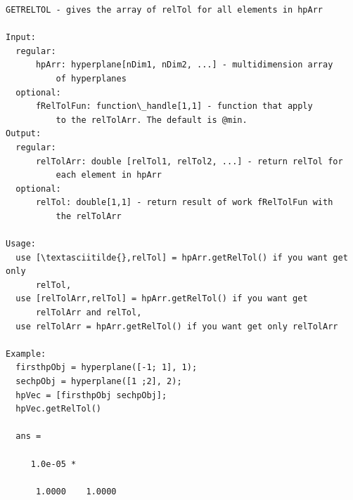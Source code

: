\documentclass[letterpaper,10pt,english]{sphinxmanual}
\begin{document}
\begin{Verbatim}[commandchars=\\\{\}]
GETRELTOL - gives the array of relTol for all elements in hpArr

Input:
  regular:
      hpArr: hyperplane[nDim1, nDim2, ...] - multidimension array
          of hyperplanes
  optional:
      fRelTolFun: function\_handle[1,1] - function that apply
          to the relTolArr. The default is @min.
Output:
  regular:
      relTolArr: double [relTol1, relTol2, ...] - return relTol for
          each element in hpArr
  optional:
      relTol: double[1,1] - return result of work fRelTolFun with
          the relTolArr

Usage:
  use [\textasciitilde{},relTol] = hpArr.getRelTol() if you want get only
      relTol,
  use [relTolArr,relTol] = hpArr.getRelTol() if you want get
      relTolArr and relTol,
  use relTolArr = hpArr.getRelTol() if you want get only relTolArr

Example:
  firsthpObj = hyperplane([-1; 1], 1);
  sechpObj = hyperplane([1 ;2], 2);
  hpVec = [firsthpObj sechpObj];
  hpVec.getRelTol()

  ans =

     1.0e-05 *

      1.0000    1.0000
\end{Verbatim}
\end{document}

